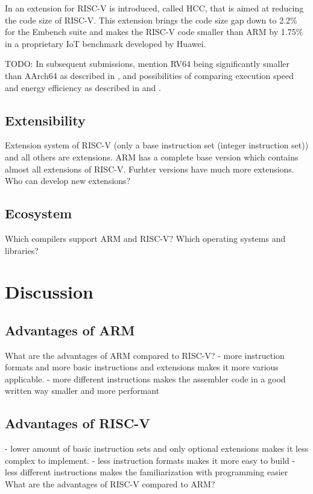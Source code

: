 \documentclass[conference]{IEEEtran}
\begin{document}
	In \cite{Perotti2020} an extension for RISC-V is introduced, called HCC, that is aimed at reducing the code size of RISC-V.
	This extension brings the code size gap down to 2.2\% for the Embench suite
	and makes the RISC-V code smaller than ARM by 1.75\% in a proprietary IoT benchmark developed by Huawei. \cite{Perotti2020}
	
	TODO: In subsequent submissions, mention RV64 being significantly smaller than AArch64 as described in \cite[page 62]{Waterman2016},
	and possibilities of comparing execution speed and energy efficiency as described in \cite{Blem2013} and \cite{Akram2017}.

	\subsection{Extensibility}\label{sec:extensibility}
	Extension system of RISC-V (only a base instruction set (integer instruction set)) and all others are extensions.
	ARM has a complete base version which contains almost all extensions of RISC-V. Furhter versions have much more extensions.
	Who can develop new extensions?
	\subsection{Ecosystem}
	Which compilers support ARM and RISC-V? Which operating systems and libraries?


\section{Discussion}
\label{ref:discussion}
	\subsection{Advantages of ARM}
	What are the advantages of ARM compared to RISC-V?
	- more instruction formats and more basic instructions and extensions makes it more various applicable.
	- more different instructions makes the assembler code in a good written way smaller and more performant
	\subsection{Advantages of RISC-V}
	- lower amount of basic instruction sets and only optional extensions makes it less complex to implement.
	- less instruction formats makes it more easy to build
	- less different instructions makes the familiarization with programming easier
	What are the advantages of RISC-V compared to ARM?
\end{document}
